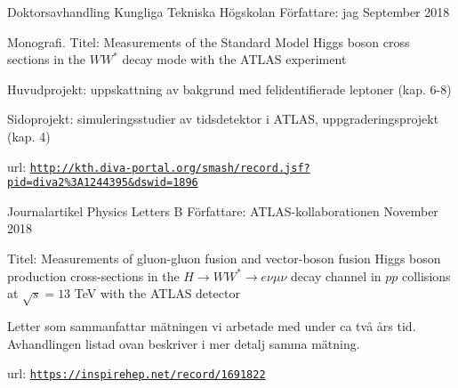 

\begin{cventries}

\cventry
{Doktorsavhandling} %
{Kungliga Tekniska H{\"o}gskolan} %
{F{\"o}rfattare: jag} %
{September 2018} %
{ %
\begin{cvitems}
\item {Monografi. Titel: Measurements of the Standard Model Higgs boson cross sections in the $WW^*$ decay mode with the ATLAS experiment}
\item Huvudprojekt: uppskattning av bakgrund med felidentifierade leptoner (kap. 6-8)
\item Sidoprojekt: simuleringsstudier av tidsdetektor i ATLAS, uppgraderingsprojekt (kap. 4)
\item url: \href{http://kth.diva-portal.org/smash/record.jsf?pid=diva2\%3A1244395\&dswid=1896}{\texttt{http://kth.diva-portal.org/smash/record.jsf?pid=diva2\%3A1244395\&dswid=1896}}
\end{cvitems}
}


\cventry
{Journalartikel} %
{Physics Letters B} %
{F{\"o}rfattare: ATLAS-kollaborationen} %
{November 2018} %
{ %
\begin{cvitems}
\item {Titel: {Measurements of gluon-gluon fusion and vector-boson
                        fusion Higgs boson production cross-sections in the $H \rightarrow
                        WW^{*} \to e\nu\mu\nu$ decay channel in $pp$ collisions
                        at $\sqrt{s}=13$ TeV with the ATLAS detector}
                        }
\item Letter som sammanfattar m{\"a}tningen vi arbetade med under ca tv{\aa} {\aa}rs tid. 
		Avhandlingen listad ovan beskriver i mer detalj samma m{\"a}tning.
\item url: \href{https://inspirehep.net/record/1691822}{\texttt{https://inspirehep.net/record/1691822}}
\end{cvitems}
}


\end{cventries}
